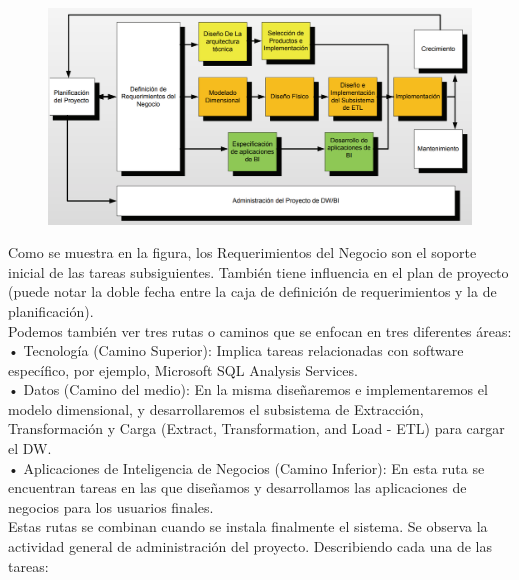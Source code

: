 \documentclass[preprint,12pt]{elsarticle}
\begin{document}
			\begin{figure}[htb]
				\begin{center}
					\includegraphics[width=15cm]{./IMAGENES/kimball2}
				\end{center}
			\end{figure}

Como se muestra en la figura, los Requerimientos del Negocio son el soporte inicial de las tareas subsiguientes. También tiene influencia en el plan de proyecto (puede notar la doble fecha entre la caja de definición de requerimientos y la de planificación).\\

Podemos también ver tres rutas o caminos que se enfocan en tres diferentes áreas:\\

•	Tecnología (Camino Superior): Implica tareas relacionadas con  software específico, por ejemplo, Microsoft SQL Analysis Services. \\
•	Datos (Camino del medio): En la misma diseñaremos e  implementaremos el modelo dimensional, y desarrollaremos el  subsistema de Extracción, Transformación y Carga (Extract,  Transformation, and Load - ETL) para cargar el DW. \\
•	Aplicaciones de Inteligencia de Negocios (Camino Inferior): En  esta ruta se encuentran tareas en las que diseñamos y  desarrollamos las aplicaciones de negocios para los usuarios  finales. \\

Estas rutas se combinan cuando se instala finalmente el sistema. Se observa la actividad general de administración del proyecto. Describiendo cada una de las tareas:\\
\end{document}
